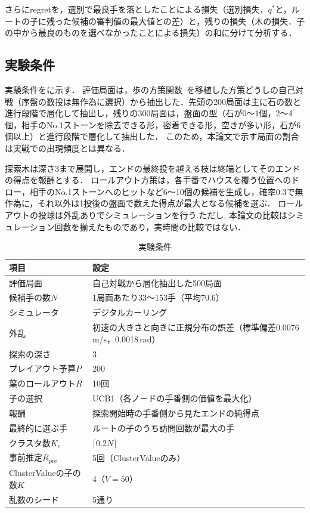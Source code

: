 \documentclass[submit]{ipsj}
\begin{document}
さらにregretを，選別で最良手を落としたことによる損失（選別損失．$q^{*}$と，ルートの子に残った候補の審判値の最大値との差）と，残りの損失（木の損失．子の中から最良のものを選べなかったことによる損失）の和に分けて分析する．

\subsection{実験条件}
実験条件をに示す．
評価局面は，歩の方策関数~\cite{owatari2016}を移植した方策どうしの自己対戦（序盤の数投は無作為に選択）から抽出した．先頭の200局面は主に石の数と進行段階で層化して抽出し，残りの300局面は，盤面の型（石が0〜1個，2〜4個，相手のNo.1ストーンを除去できる形，密着できる形，空きが多い形，石が6個以上）と進行段階で層化して抽出した．
このため，本論文で示す局面の割合は実戦での出現頻度とは異なる．

探索木は深さ3まで展開し，エンドの最終投を越える枝は終端としてそのエンドの得点を報酬とする．
ロールアウト方策は，各手番でハウスを覆う位置へのドロー，相手のNo.1ストーンへのヒットなど6〜10個の候補を生成し，確率0.3で無作為に，それ以外は1投後の盤面で数えた得点が最大となる候補を選ぶ．
ロールアウトの投球は外乱ありでシミュレーションを行う.ただし, 本論文の比較はシミュレーション回数を揃えたものであり，実時間の比較ではない．

\begin{table}[tb]
\caption{実験条件}
\label{tab:settings}
\centering
\begin{tabular}{p{}p{}}\hline\hline
項目 & 設定 \\\hline
評価局面 & 自己対戦から層化抽出した500局面 \\
候補手の数$N$ & 1局面あたり33〜153手（平均70.6） \\
シミュレータ & デジタルカーリング~\cite{dc3} \\
外乱 & 初速の大きさと向きに正規分布の誤差（標準偏差0.0076\,m/s，0.0018\,rad） \\
探索の深さ & 3 \\
プレイアウト予算$P$ & 200 \\
葉のロールアウト$R$ & 10回 \\
子の選択 & UCB1（各ノードの手番側の価値を最大化） \\
報酬 & 探索開始時の手番側から見たエンドの純得点 \\
最終的に選ぶ手 & ルートの子のうち訪問回数が最大の手 \\
クラスタ数$K_c$ & $\lceil 0.2N \rceil$ \\
事前推定$R_{\mathrm{pre}}$ & 5回（ClusterValueのみ） \\
ClusterValueの子の数$K$ & 4（$V=50$） \\
乱数のシード & 5通り \\\hline
\end{tabular}
\end{table}
\end{document}
